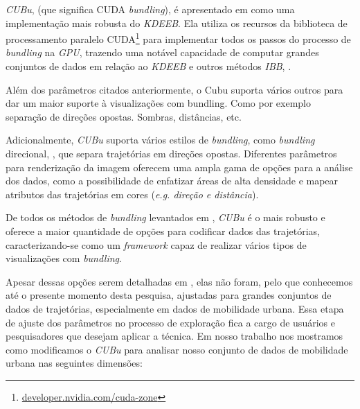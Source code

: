 \emph{CUBu}, (que significa CUDA \emph{bundling}), é apresentado em
\citet{zwan:16} como uma implementação mais robusta do \emph{KDEEB}. Ela
utiliza os recursos da biblioteca de processamento paralelo
CUDA\footnote{\url{developer.nvidia.com/cuda-zone}} para implementar todos os
passos do processo de \emph{bundling} na \emph{GPU}, trazendo uma notável
capacidade de computar grandes conjuntos de dados em relação ao \emph{KDEEB}
e outros métodos \emph{IBB}, \citet{adeb,lhuillier-fft:17}.

Além dos parâmetros citados anteriormente, o Cubu suporta vários
outros para dar um maior suporte à visualizações com bundling. Como por
exemplo separação de direções opostas. Sombras, distâncias, etc.

Adicionalmente, \emph{CUBu} suporta vários estilos de \emph{bundling},
como \emph{bundling} direcional, \citep{adeb}, que separa trajetórias
em direções opostas. Diferentes parâmetros para renderização da imagem oferecem
uma ampla gama de opções para a análise dos dados, como a possibilidade de
enfatizar áreas de alta densidade e mapear atributos das trajetórias
em cores (\emph{e.g. direção e distância}).
 
De todos os métodos de \emph{bundling} levantados em \cite{lhuillier:17},
\emph{CUBu} é o mais robusto e oferece a maior quantidade de opções para codificar
dados das trajetórias, caracterizando-se como um \emph{framework} capaz de realizar
vários tipos de visualizações com \emph{bundling}.


Apesar dessas opções serem detalhadas em \cite{zwan:16},
elas não foram, pelo que conhecemos até o presente momento desta pesquisa, ajustadas para
grandes conjuntos de dados de trajetórias, especialmente em dados de mobilidade urbana.
Essa etapa de ajuste dos parâmetros no processo de exploração fica a cargo de usuários e pesquisadores
que desejam aplicar a técnica. Em nosso trabalho nos mostramos como modificamos
o \emph{CUBu} para analisar nosso conjunto de dados de mobilidade urbana nas seguintes
dimensões:

